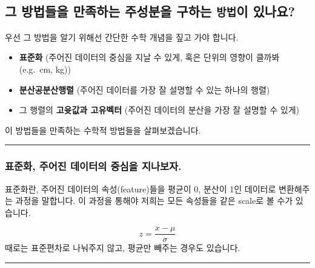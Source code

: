 \documentclass[
]{article}
\providecommand{\tightlist}{%
  \setlength{\itemsep}{0pt}\setlength{\parskip}{0pt}}
\begin{document}
\hypertarget{uxadf8-uxbc29uxbc95uxb4e4uxc744-uxb9ccuxc871uxd558uxb294-uxc8fcuxc131uxbd84uxc744-uxad6cuxd558uxb294-uxbc29uxbc95uxc774-uxc788uxb098uxc694}{%
\subsection{\texorpdfstring{그 방법들을 만족하는 주성분을 구하는
\texttt{방법}이
있나요?}{그 방법들을 만족하는 주성분을 구하는 방법이 있나요?}}\label{uxadf8-uxbc29uxbc95uxb4e4uxc744-uxb9ccuxc871uxd558uxb294-uxc8fcuxc131uxbd84uxc744-uxad6cuxd558uxb294-uxbc29uxbc95uxc774-uxc788uxb098uxc694}}

우선 그 방법을 알기 위해선 간단한 수학 개념을 짚고 가야 합니다.

\begin{itemize}
\tightlist
\item
  \textbf{표준화} (주어진 데이터의 중심을 지날 수 있게, 혹은 단위의
  영향이 클까봐(e.g.~cm, kg))
\item
  \textbf{분산공분산행렬} (주어진 데이터를 가장 잘 설명할 수 있는 하나의
  행렬)\\
\item
  그 행렬의 \textbf{고윳값과 고유벡터} (주어진 데이터의 분산을 가장 잘
  설명할 수 있게)
\end{itemize}

이 방법들을 만족하는 수학적 방법들을 살펴보겠습니다.

\begin{center}\rule{0.5\linewidth}{0.5pt}\end{center}

\hypertarget{uxd45cuxc900uxd654-uxc8fcuxc5b4uxc9c4-uxb370uxc774uxd130uxc758-uxc911uxc2ecuxc744-uxc9c0uxb098uxbcf4uxc790.}{%
\subsubsection{표준화, 주어진 데이터의 중심을
지나보자.}\label{uxd45cuxc900uxd654-uxc8fcuxc5b4uxc9c4-uxb370uxc774uxd130uxc758-uxc911uxc2ecuxc744-uxc9c0uxb098uxbcf4uxc790.}}

표준화란, 주어진 데이터의 속성(feature)들을 평균이 0, 분산이 1인
데이터로 변환해주는 과정을 말합니다. 이 과정을 통해야 저희는 모든
속성들을 같은 scale로 볼 수가 있습니다.

\[
z = \frac{x - \mu}{\sigma}
\] 때로는 표준편차로 나눠주지 않고, 평균만 빼주는 경우도 있습니다.

\begin{center}\rule{0.5\linewidth}{0.5pt}\end{center}
\end{document}
